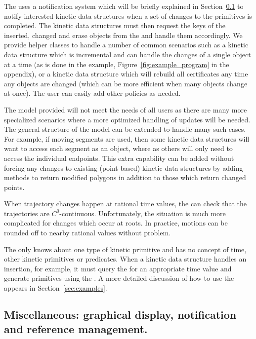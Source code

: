 The  uses a notification system which will be
briefly explained in Section~\ref{sec:misc} to notify interested
kinetic data structures when a set of changes to the primitives is
completed. The kinetic data structures must then request the keys of
the inserted, changed and erase objects from the
 and handle them accordingly. We provide helper
classes to handle a number of common scenarios such as a kinetic data
structure which is incremental and can handle the changes of a single
object at a time (as is done in the example,
Figure~\ref{fig:example_program} in the appendix), or a kinetic data
structure which will rebuild all certificates any time any objects are
changed (which can be more efficient when many objects change at
once). The user can easily add other policies as needed.

The  model provided will not meet the needs of
all users as there are many more specialized scenarios where a more
optimized handling of updates will be needed. The general structure of
the  model can be extended to handle many such
cases. For example, if moving segments are used, then some kinetic
data structures will want to access each segment as an object, where
as others will only need to access the individual endpoints. This extra
capability can be added without forcing any changes to existing (point
based) kinetic data structures by adding methods to return modified
polygons in addition to those which return changed points.

When trajectory changes happen at rational time values, the
 can check that the trajectories are
$C^0$-continuous. Unfortunately, the situation is much more
complicated for changes which occur at roots. In practice, motions can
be rounded off to nearby rational values without problem.

The  only knows about one type of kinetic
primitive and has no concept of time, other kinetic primitives or
predicates. When a kinetic data structure handles an insertion, for
example, it must query the  for an appropriate time
value and generate primitives using the . A more
detailed discussion of how to use the  appears
in Section~\ref{sec:examples}.

\subsection{Miscellaneous: graphical display, notification and reference management.}
\label{sec:misc}

